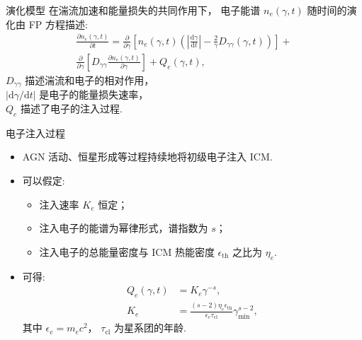 \documentclass{beamer}
\newcommand{\R}[1]{\text{#1}}  %
\newcommand{\D}[1]{\R{d}#1}
\newcommand{\diff}[2]{\frac{\D{#1}}{\D{#2}}}
\newcommand{\pdiff}[2]{\frac{\partial #1}{\partial #2}}
\begin{document}
\begin{frame}{演化模型}
  在湍流加速和能量损失的共同作用下，
  电子能谱 $n_e(\gamma, t)$ 随时间的演化由 \alert{FP 方程}描述:
  \begin{multline}
    \pdiff{n_e(\gamma, t)}{t} =
      \pdiff{}{\gamma} \left[ n_e(\gamma, t) \left(
        \left| \diff{\gamma}{t} \right| -
        \frac{2}{\gamma} D_{\gamma\gamma}(\gamma, t) \right) \right] + \\
      \pdiff{}{\gamma} \left[
      D_{\gamma\gamma} \pdiff{n_e(\gamma, t)}{\gamma} \right]
      + Q_e(\gamma, t) ,
  \end{multline}
  $D_{\gamma\gamma}$ 描述湍流和电子的相对作用，\\
  $|\R{d}\gamma / \R{d}t|$ 是电子的能量损失速率，\\
  $Q_e$ 描述了电子的注入过程.
\end{frame}

\begin{frame}
  \begin{alertblock}{电子注入过程}
    \smallskip
    \begin{itemize}
      \item AGN 活动、恒星形成等过程持续地将初级电子注入 ICM.
      \item 可以假定:
        \begin{itemize}
          \item 注入速率 $K_e$ 恒定；
          \item 注入电子的能谱为幂律形式，谱指数为 $s$；
          \item 注入电子的总能量密度与 ICM 热能密度 $\epsilon_{\R{th}}$
            之比为 $\eta_e$.
        \end{itemize}
      \item 可得:
        \begin{align}
          Q_e(\gamma, t) & = K_e \gamma^{-s} , \\
          K_e & = \frac{(s-2) \eta_e \epsilon_{\R{th}}}{
            \epsilon_e \tau_{\R{cl}}} \gamma_{\R{min}}^{s-2} ,
        \end{align}
        其中 $\epsilon_e = m_e c^2$，
        $\tau_{\R{cl}}$ 为星系团的年龄.
    \end{itemize}
  \end{alertblock}
\end{frame}
\end{document}
